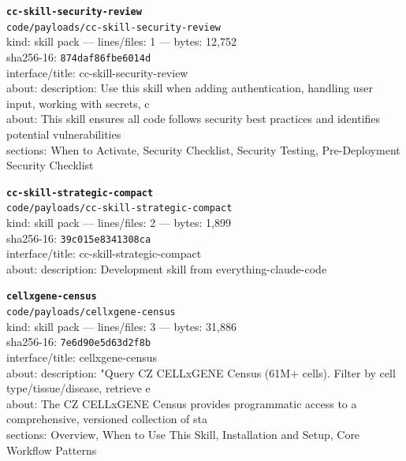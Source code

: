 \noindent\textbf{\texttt{cc-skill-security-review}}\\
\texttt{code/payloads/cc-skill-security-review}\\
kind: skill pack --- lines/files: 1 --- bytes: 12,752\\
sha256-16: \texttt{874daf86fbe6014d}\\
interface/title: cc-skill-security-review\\
about: description: Use this skill when adding authentication, handling user input, working with secrets, c\\
about: This skill ensures all code follows security best practices and identifies potential vulnerabilities\\
sections: When to Activate, Security Checklist, Security Testing, Pre-Deployment Security Checklist\\
\vspace*{6.0pt}

\noindent\textbf{\texttt{cc-skill-strategic-compact}}\\
\texttt{code/payloads/cc-skill-strategic-compact}\\
kind: skill pack --- lines/files: 2 --- bytes: 1,899\\
sha256-16: \texttt{39c015e8341308ca}\\
interface/title: cc-skill-strategic-compact\\
about: description: Development skill from everything-claude-code\\
\vspace*{6.0pt}
\newpage

\noindent\textbf{\texttt{cellxgene-census}}\\
\texttt{code/payloads/cellxgene-census}\\
kind: skill pack --- lines/files: 3 --- bytes: 31,886\\
sha256-16: \texttt{7e6d90e5d63d2f8b}\\
interface/title: cellxgene-census\\
about: description: "Query CZ CELLxGENE Census (61M+ cells). Filter by cell type/tissue/disease, retrieve e\\
about: The CZ CELLxGENE Census provides programmatic access to a comprehensive, versioned collection of sta\\
sections: Overview, When to Use This Skill, Installation and Setup, Core Workflow Patterns\\
\vspace*{6.0pt}

